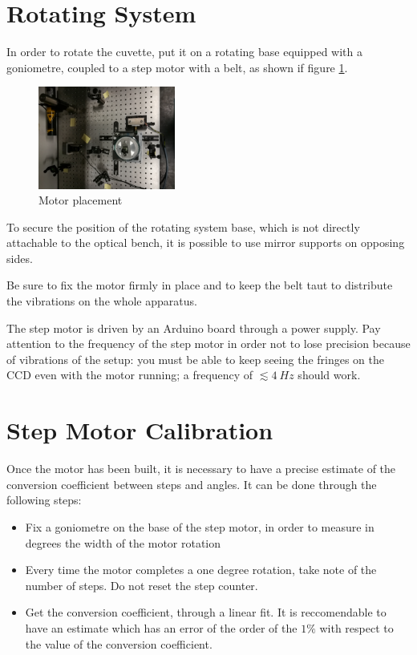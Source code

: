 \documentclass[a4paper, 12pt]{article}
\begin{document}
\section{Rotating System}

In order to rotate the cuvette, put it on a rotating base equipped with a goniometre, coupled to a step motor with a belt, as shown if figure \ref{fig:top_view}.

\begin{figure}[H]
    \centering
    \includegraphics[width=0.4\textwidth]{img/motor_top_view.jpg}
    \caption{Motor placement}
    \label{fig:top_view}
\end{figure}

To secure the position of the rotating system base, which is not directly attachable to the optical bench, it is possible to use mirror supports on opposing sides.

Be sure to fix the motor firmly in place and to keep the belt taut to distribute the vibrations on the whole apparatus.

The step motor is driven by an Arduino board through a power supply.
Pay attention to the frequency of the step motor in order not to lose precision because of vibrations of the setup: you must be able to keep seeing the fringes on the CCD even with the motor running; a frequency of $\lesssim \SI{4}{Hz}$ should work.

\section{Step Motor Calibration}
Once the motor has been built, it is necessary to have a precise estimate of the conversion coefficient between steps and angles. 
It can be done through the following steps: 
\begin{itemize}
    \item Fix a goniometre on the base of the step motor, in order to measure in degrees the width of the motor rotation
    \item Every time the motor completes a one degree rotation, take note of the number of steps. Do not reset the step counter.
    \item Get the conversion coefficient, through a linear fit. It is reccomendable to have an estimate which has an error of the order of the $1 \%$ with respect to the value of the conversion coefficient.
\end{itemize}
\end{document}
